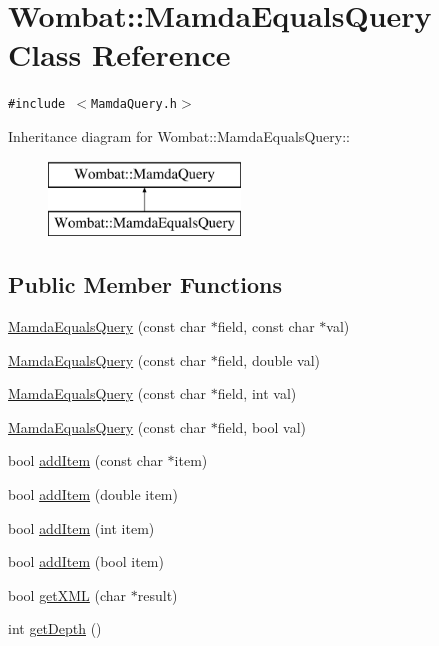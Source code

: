 \hypertarget{classWombat_1_1MamdaEqualsQuery}{
\section{Wombat::Mamda\-Equals\-Query Class Reference}
\label{classWombat_1_1MamdaEqualsQuery}
}
{\tt \#include $<$Mamda\-Query.h$>$}

Inheritance diagram for Wombat::Mamda\-Equals\-Query::\begin{figure}[H]
\begin{center}
\leavevmode
\includegraphics[height=2cm]{classWombat_1_1MamdaEqualsQuery}
\end{center}
\end{figure}
\subsection*{Public Member Functions}
\begin{CompactItemize}
\item 
\hyperlink{classWombat_1_1MamdaEqualsQuery_5f25a08aac5b624213104d3526def6ec}{Mamda\-Equals\-Query} (const char $\ast$field, const char $\ast$val)
\item 
\hyperlink{classWombat_1_1MamdaEqualsQuery_935a146d1aed106cca65469f307bc54a}{Mamda\-Equals\-Query} (const char $\ast$field, double val)
\item 
\hyperlink{classWombat_1_1MamdaEqualsQuery_fe445345550d741d7a739b1f42f823a9}{Mamda\-Equals\-Query} (const char $\ast$field, int val)
\item 
\hyperlink{classWombat_1_1MamdaEqualsQuery_289475a1124e35325eef49a1b230b31b}{Mamda\-Equals\-Query} (const char $\ast$field, bool val)
\item 
bool \hyperlink{classWombat_1_1MamdaEqualsQuery_9424d8cf0d5cb3e5639956249c3bbdb9}{add\-Item} (const char $\ast$item)
\item 
bool \hyperlink{classWombat_1_1MamdaEqualsQuery_0ca3da96ca797709543b3d1045e474b0}{add\-Item} (double item)
\item 
bool \hyperlink{classWombat_1_1MamdaEqualsQuery_d10dba4c193e0a36ba3088a88ba6279f}{add\-Item} (int item)
\item 
bool \hyperlink{classWombat_1_1MamdaEqualsQuery_b90c6e8eb5d821cd9ae60e33f1917739}{add\-Item} (bool item)
\item 
bool \hyperlink{classWombat_1_1MamdaEqualsQuery_885f8343de127e0af91a4b4ed098474f}{get\-XML} (char $\ast$result)
\item 
int \hyperlink{classWombat_1_1MamdaEqualsQuery_3eaff88623a715717e61585754ddfde2}{get\-Depth} ()
\end{CompactItemize}


